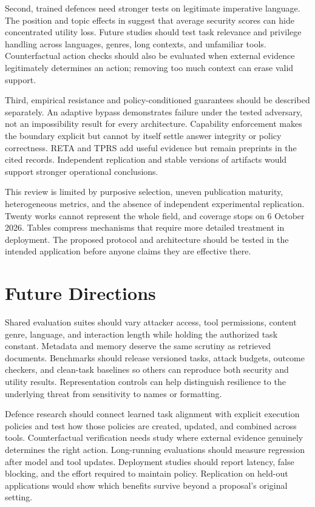 \documentclass[conference]{IEEEtran}
\begin{document}
Second, trained defences need stronger tests on legitimate imperative language. The position and topic effects in \cite{li2026heuristics} suggest that average security scores can hide concentrated utility loss. Future studies should test task relevance and privilege handling across languages, genres, long contexts, and unfamiliar tools. Counterfactual action checks should also be evaluated when external evidence legitimately determines an action; removing too much context can erase valid support.

Third, empirical resistance and policy-conditioned guarantees should be described separately. An adaptive bypass demonstrates failure under the tested adversary, not an impossibility result for every architecture. Capability enforcement makes the boundary explicit but cannot by itself settle answer integrity or policy correctness. RETA \cite{he2026reta} and TPRS \cite{karamchandani2026tprs} add useful evidence but remain preprints in the cited records. Independent replication and stable versions of artifacts would support stronger operational conclusions.

This review is limited by purposive selection, uneven publication maturity, heterogeneous metrics, and the absence of independent experimental replication. Twenty works cannot represent the whole field, and coverage stops on 6 October 2026. Tables compress mechanisms that require more detailed treatment in deployment. The proposed protocol and architecture should be tested in the intended application before anyone claims they are effective there.

\section{Future Directions}
Shared evaluation suites should vary attacker access, tool permissions, content genre, language, and interaction length while holding the authorized task constant. Metadata and memory deserve the same scrutiny as retrieved documents. Benchmarks should release versioned tasks, attack budgets, outcome checkers, and clean-task baselines so others can reproduce both security and utility results. Representation controls can help distinguish resilience to the underlying threat from sensitivity to names or formatting.

Defence research should connect learned task alignment with explicit execution policies and test how those policies are created, updated, and combined across tools. Counterfactual verification needs study where external evidence genuinely determines the right action. Long-running evaluations should measure regression after model and tool updates. Deployment studies should report latency, false blocking, and the effort required to maintain policy. Replication on held-out applications would show which benefits survive beyond a proposal's original setting.
\end{document}
